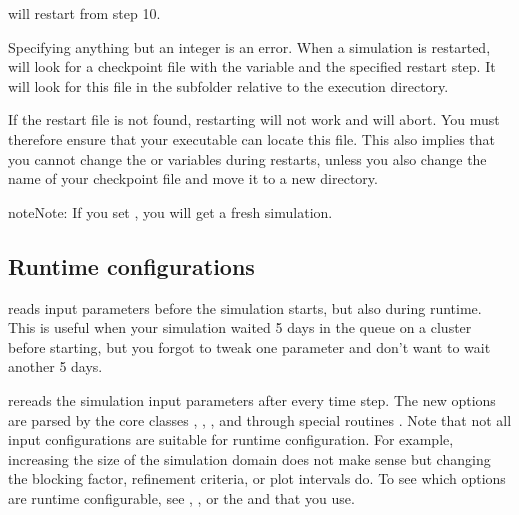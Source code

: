 \documentclass[letterpaper,10pt,english]{sphinxmanual}
\begin{document}
will restart from step 10.

Specifying anything but an integer is an error.
When a simulation is restarted,  will look for a checkpoint file with the  variable and the specified restart step.
It will look for this file in the subfolder  relative to the execution directory.

If the restart file is not found, restarting will not work and  will abort.
You must therefore ensure that your executable can locate this file.
This also implies that you cannot change the  or  variables during restarts, unless you also change the name of your checkpoint file and move it to a new directory.

\begin{sphinxadmonition}{note}{Note:}
If you set , you will get a fresh simulation.
\end{sphinxadmonition}


\subsection{Run\sphinxhyphen{}time configurations}
\label{\detokenize{Base/Control:run-time-configurations}}\label{\detokenize{Base/Control:chap-runtimeconfig}}
 reads input parameters before the simulation starts, but also during run\sphinxhyphen{}time.
This is useful when your simulation waited 5 days in the queue on a cluster before starting, but you forgot to tweak one parameter and don’t want to wait another 5 days.

 re\sphinxhyphen{}reads the simulation input parameters after every time step.
The new options are parsed by the core classes , , , and  through special routines .
Note that not all input configurations are suitable for run\sphinxhyphen{}time configuration.
For example, increasing the size of the simulation domain does not make sense but changing the blocking factor, refinement criteria, or plot intervals do.
To see which options are run\sphinxhyphen{}time configurable, see {\hyperref[\detokenize{Source/Driver:chap-driver}]{}}, {\hyperref[\detokenize{Source/AmrMesh:chap-amrmesh}]{}}, or the  and  that you use.
\end{document}
